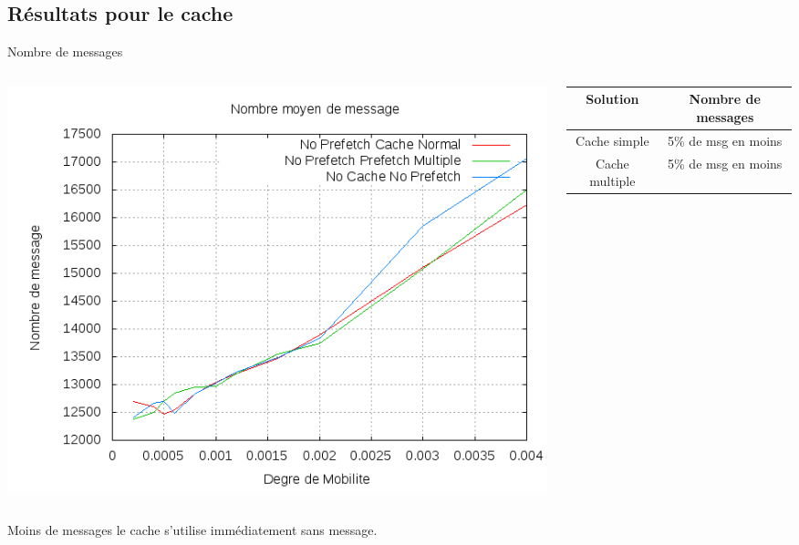 \documentclass{beamer}
\begin{document}
 
  \subsection{Résultats pour le cache}
  \begin{frame}
	\begin{center}
	Nombre de messages 
	\end{center}
	\begin{columns}
         \begin{column}{5cm}
          \includegraphics[scale=0.25]{./Ressources/Images/Courbes_Final_Rapport/Nombre_Messages_Caches.png}\\
         \end{column}
         \begin{column}{5cm}
	\footnotesize{ \begin{table}[!h]
                \begin{center}
                \begin{tabular}{|c|c|}
                \hline
                Solution & Nombre de messages \\
                \hline
                Cache simple &  5\% de msg en moins\\
                Cache multiple &  5\% de msg en moins\\
                \hline
                \end{tabular}
                \end{center}
        \end{table}}
         \end{column}
        \end{columns}
        \begin{itemize}\footnotesize{
                \item Moins de messages le cache s'utilise immédiatement sans message.
        }
        \end{itemize}
  \end{frame}
\end{document}
